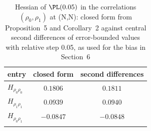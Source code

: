\begin{table}[t]
\caption{Hessian of $\PL(0.05)$ in the correlations $(\rho_0,\rho_1)$ at (N,N): closed form from Proposition~5 and Corollary~2 against central second differences of error-bounded values with relative step 0.05, as used for the bias in Section~6}\label{tab:weakhessian}
\small
\begin{tabular*}{\textwidth}{@{\extracolsep\fill}lcc@{}}
\toprule
entry & closed form & second differences\\
\midrule
$H_{\rho_0\rho_0}$ & $0.1806$ & $0.1811$\\
$H_{\rho_1\rho_1}$ & $0.0939$ & $0.0940$\\
$H_{\rho_0\rho_1}$ & $-0.0847$ & $-0.0848$\\
\botrule
\end{tabular*}
\end{table}

